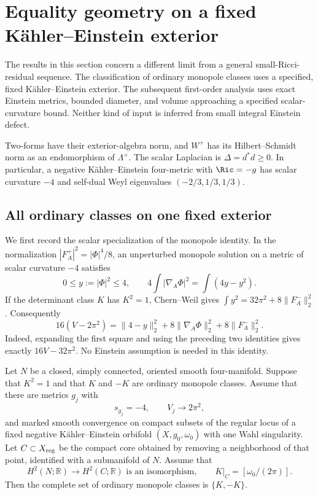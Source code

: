 \section{Equality geometry on a fixed Kähler--Einstein exterior}
\label{sec:early-equality-geometry}

The results in this section concern a different limit from a general
small-Ricci-residual sequence.  The classification of ordinary monopole
classes uses a specified, fixed Kähler--Einstein exterior.  The subsequent
first-order analysis uses exact Einstein metrics, bounded diameter, and
volume approaching a specified scalar-curvature bound.  Neither kind of
input is inferred from small integral Einstein defect.

Two-forms have their exterior-algebra norm, and $W^+$ has its
Hilbert--Schmidt norm as an endomorphism of $\Lambda^+$.  The scalar
Laplacian is $\Delta=d^*d\geq0$.  In particular, a negative
Kähler--Einstein four-metric with $\Ric=-g$ has scalar curvature $-4$
and self-dual Weyl eigenvalues $(-2/3,1/3,1/3)$.

\subsection{All ordinary classes on one fixed exterior}

We first record the scalar specialization of the monopole identity.
In the normalization $|F_A^+|^2=|\Phi|^4/8$, an unperturbed monopole
solution on a metric of scalar curvature $-4$ satisfies
\[
 0\leq y:=|\Phi|^2\leq4,
 \qquad 4\int|\nabla_A\Phi|^2=\int(4y-y^2).
\]
If the determinant class $K$ has $K^2=1$, Chern--Weil gives
$\int y^2=32\pi^2+8\|F_A^-\|_2^2$.  Consequently
\begin{equation}\label{eq:eqg-sw-defect}
 16(V-2\pi^2)
 =\|4-y\|_2^2+8\|\nabla_A\Phi\|_2^2+8\|F_A^-\|_2^2.
\end{equation}
Indeed, expanding the first square and using the preceding two
identities gives exactly $16V-32\pi^2$.  No Einstein assumption is
needed in this identity.

\begin{theorem}
\label{thm:eqg-ordinary}
Let $N$ be a closed, simply connected, oriented smooth four-manifold.
Suppose that $K^2=1$ and that $K$ and $-K$ are ordinary monopole classes.
Assume that there are metrics $g_j$ with
\[
 s_{g_j}=-4,\qquad V_j\longrightarrow2\pi^2,
\]
and marked smooth convergence on compact subsets of the regular locus
of a fixed negative Kähler--Einstein orbifold $(X,g_0,\omega_0)$
with one Wahl singularity.  Let $C\subset X_{\rm reg}$ be the compact
core obtained by removing a neighborhood of that point, identified
with a submanifold of $N$.  Assume that
\begin{equation}\label{eq:eqg-core-cohomology}
 H^2(N;\mathbb R)\longrightarrow H^2(C;\mathbb R)
 \text{ is an isomorphism},\qquad
 K|_C=[\omega_0/(2\pi)].
\end{equation}
Then the complete set of ordinary monopole classes is $\{K,-K\}$.
\end{theorem}

